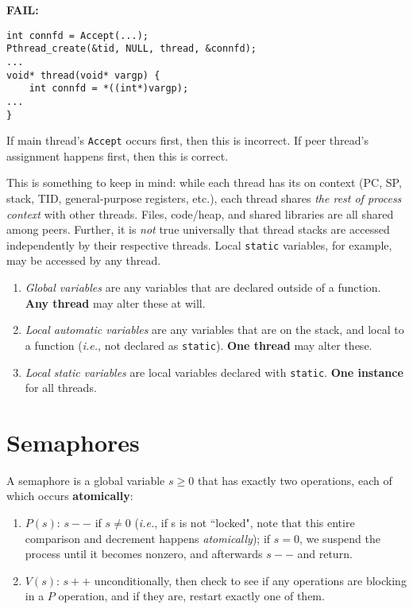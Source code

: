 \documentclass[fleqn]{article}
\begin{document}
\textbf{FAIL:}

\begin{verbatim}
int connfd = Accept(...);
Pthread_create(&tid, NULL, thread, &connfd);
...
void* thread(void* vargp) {
    int connfd = *((int*)vargp);
...
}
\end{verbatim}

If main thread's \texttt{Accept} occurs first, then this is incorrect. If peer thread's assignment happens first, then this is correct.

This is something to keep in mind: while each thread has its on context (PC, SP, stack, TID, general-purpose registers, etc.), each thread shares \textit{the rest of process context} with other threads. Files, code/heap, and shared libraries are all shared among peers. Further, it is \textit{not} true universally that thread stacks are accessed independently by their respective threads. Local \texttt{static} variables, for example, may be accessed by any thread.

\begin{enumerate}
\item \textit{Global variables} are any variables that are declared outside of a function. \textbf{Any thread} may alter these at will.

\item \textit{Local automatic variables} are any variables that are on the stack, and local to a function (\textit{i.e.}, not declared as \texttt{static}). \textbf{One thread} may alter these.

\item \textit{Local static variables} are local variables declared with \texttt{static}. \textbf{One instance} for all threads.
\end{enumerate}



\section{Semaphores}

A semaphore is a global variable $s \ge 0$ that has exactly two operations, each of which occurs \textbf{atomically}:

\begin{enumerate}
\item $P(s)$: $s--$ if $s \neq 0$ (\textit{i.e.}, if s is not ``locked", note that this entire comparison and decrement happens \textit{atomically}); if $s = 0$, we suspend the process until it becomes nonzero, and afterwards $s--$ and return.

\item $V(s)$: $s++$ unconditionally, then check to see if any operations are blocking in a $P$ operation, and if they are, restart exactly one of them.
\end{enumerate}
\end{document}
